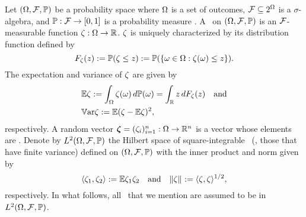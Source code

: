 Let $(\Omega, \mathcal{F}, \mathbb{P})$ be a probability space where $\Omega$ is a set of
outcomes, $\mathcal{F} \subseteq 2^\Omega$ is a $\sigma$-algebra, and
$\mathbb{P}: \mathcal{F} \to [0, 1]$ is a probability measure
\cite{durrett2010}. A \rv\ on $(\Omega, \mathcal{F}, \mathbb{P})$ is an
$\mathcal{F}$-measurable function $\zeta: \Omega \to \mathbb{R}$. $\zeta$ is uniquely
characterized by its distribution function defined by
\begin{equation*}
  F_\zeta(z) := \mathbb{P}(\zeta \leq z) := \mathbb{P}(\{ \omega \in \Omega: \zeta(\omega) \leq z \}).
\end{equation*}
The expectation and variance of $\zeta$ are given by
\begin{align*}
  & \mathbb{E} \zeta := \int_\Omega \zeta(\omega) \, d\mathbb{P}(\omega) = \int_{\mathbb{R}} z \, d F_\zeta(z) \hspace{1em} \text{and} \\
  & \mathbb{V}\text{ar} \zeta := \mathbb{E} (\zeta - \mathbb{E} \zeta)^2,
\end{align*}
respectively. A random vector $\bm{\zeta} = (\zeta_i)_{i = 1}^n: \Omega \to \mathbb{R}^n$ is
a vector whose elements are \rvs. Denote by $L^{2}(\Omega, \mathcal{F}, \mathbb{P})$ the Hilbert
space of square-integrable \rvs\ (\ie, those that have finite variance) defined
on $(\Omega, \mathcal{F}, \mathbb{P})$ with the inner product and norm given by
\begin{equation*}
  \langle \zeta_1, \zeta_2 \rangle := \mathbb{E} \zeta_1 \zeta_2 \hspace{1em} \text{and} \hspace{1em} \| \zeta \|_{} := \langle \zeta, \zeta \rangle^{1/2},
\end{equation*}
respectively. In what follows, all \rvs\ that we mention are assumed to be in
$L^{2}(\Omega, \mathcal{F}, \mathbb{P})$.
